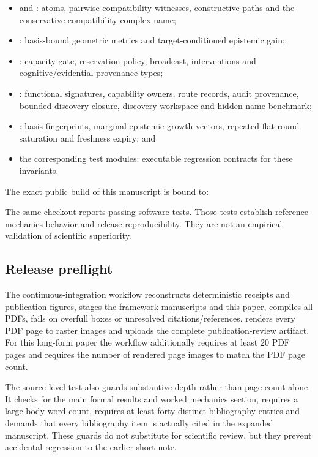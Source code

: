 \begin{itemize}[leftmargin=*]
\item {} and : atoms, pairwise compatibility witnesses, constructive paths and the conservative compatibility-complex name;
\item {}: basis-bound geometric metrics and target-conditioned epistemic gain;
\item {}: capacity gate, reservation policy, broadcast, interventions and cognitive/evidential provenance types;
\item {}: functional signatures, capability owners, route records, audit provenance, bounded discovery closure, discovery workspace and hidden-name benchmark;
\item {}: basis fingerprints, marginal epistemic growth vectors, repeated-flat-round saturation and freshness expiry; and
\item the corresponding test modules: executable regression contracts for these invariants.
\end{itemize}

The exact public build of this manuscript is bound to:

\begin{center}
\ImplementationSHA
\end{center}

The same checkout reports \SoftwareTests{} passing software tests. Those tests establish reference-mechanics behavior and release reproducibility. They are not an empirical validation of scientific superiority.

\subsection{Release preflight}

The continuous-integration workflow reconstructs deterministic receipts and publication figures, stages the framework manuscripts and this paper, compiles all PDFs, fails on overfull boxes or unresolved citations/references, renders every PDF page to raster images and uploads the complete publication-review artifact. For this long-form paper the workflow additionally requires at least 20 PDF pages and requires the number of rendered page images to match the PDF page count.

The source-level test also guards substantive depth rather than page count alone. It checks for the main formal results and worked mechanics section, requires a large body-word count, requires at least forty distinct bibliography entries and demands that every bibliography item is actually cited in the expanded manuscript. These guards do not substitute for scientific review, but they prevent accidental regression to the earlier short note.

